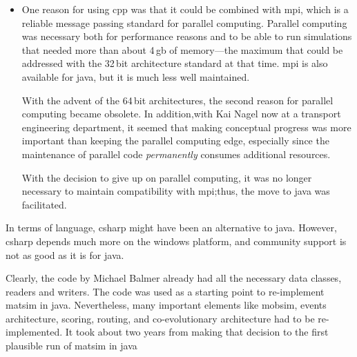 \begin{itemize}


In addition, it seems that the gap between \gls{cpp} and \gls{java} has narrowed further since then.  Important differences remain in numerical applications, also partly because \gls{cpp}, other than the \gls{java}, allows operator overloading.\footnote{See \url{http://en.wikipedia.org/wiki/Operator_overloading}.}  However, \gls{matsim}'s agent-based approach means that complex objects are handled much more frequently than true numerical computations.

\item One reason for using \gls{cpp} was that it could be combined with \gls{mpi}, which is a reliable message passing standard for parallel computing.  Parallel computing was necessary both for performance reasons and to be able to run simulations that needed more than about 4\,\gls{gb} of memory---the maximum that could be addressed with the 32\,bit architecture standard at that time.  \gls{mpi} is also available for \gls{java}, but it is much less well maintained.

With the advent of the 64\,bit architectures, the second reason for parallel computing became obsolete. In addition,with Kai Nagel now at a transport engineering department, it seemed that making conceptual progress was more important than keeping the parallel computing edge, especially since the maintenance of parallel code \emph{permanently} consumes additional resources.

With the decision to give up on parallel computing, it was no longer necessary to maintain compatibility with \gls{mpi};thus, the move to \gls{java} was facilitated.

\end{itemize}
%
In terms of language, \gls{csharp} might have been an alternative to \gls{java}.  However, \gls{csharp} depends much more on the \gls{windows} platform, and community support is not as good as it is for \gls{java}.

Clearly, the code by Michael Balmer already had all the necessary data classes, readers and writers. The code was used as a starting point to re-implement \gls{matsim} in \gls{java}.  Nevertheless, many important elements like \gls{mobsim}, events architecture, scoring, routing, and co-evolutionary architecture had to be re-implemented.  It took about two years from making that decision to the first plausible run of \gls{matsim} in \gls{java}

